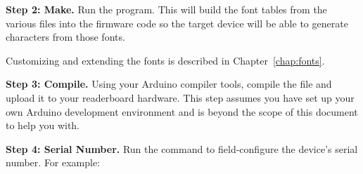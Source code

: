 {\bfseries Step 2: Make.}
		Run the  program. This will build the font tables from the various
		 files into the firmware code so the target device will be able to
		generate characters from those fonts.

		Customizing and extending the fonts is described in Chapter~\ref{chap:fonts}.

{\bfseries Step 3: Compile.}
		Using your Arduino compiler tools, compile the  file and upload it
		to your readerboard hardware. This step assumes you have set up your own Arduino
		development environment and is beyond the scope of this document to help you with.

{\bfseries Step 4: Serial Number.}
		Run the  command to field-configure the device's serial number. For example:
\begin{SourceCode}
\end{SourceCode}

